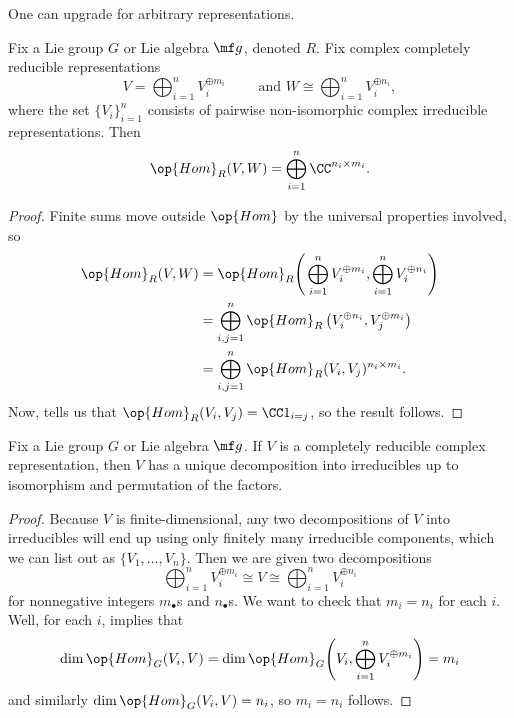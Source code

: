 \documentclass[../notes.tex]{subfiles}
\begin{document}
One can upgrade  for arbitrary representations.
\begin{corollary} \label{cor:compute-hom-by-irreps}
	Fix a Lie group $G$ or Lie algebra $\mf g$, denoted $R$. Fix complex completely reducible representations
	\[V=\bigoplus_{i=1}^nV_i^{\oplus m_i}\qquad\text{ and }W\cong\bigoplus_{i=1}^nV_i^{\oplus n_i},\]
	where the set $\{V_i\}_{i=1}^n$ consists of pairwise non-isomorphic complex irreducible representations. Then
	\[\op{Hom}_R(V,W)=\bigoplus_{i=1}^n\CC^{n_i\times m_i}.\]
\end{corollary}
\begin{proof}
	Finite sums move outside $\op{Hom}$ by the universal properties involved, so
	\begin{align*}
		\op{Hom}_R(V,W) &= \op{Hom}_R\Bigg(\bigoplus_{i=1}^nV_i^{\oplus m_i},\bigoplus_{i=1}^nV_i^{\oplus n_i}\Bigg) \\
		&= \bigoplus_{i,j=1}^n\op{Hom}_R\left(V_i^{\oplus n_i},V_j^{\oplus m_i}\right) \\
		&= \bigoplus_{i,j=1}^n\op{Hom}_R(V_i,V_j)^{n_i\times m_i}.
	\end{align*}
	Now,  tells us that $\op{Hom}_R(V_i,V_j)=\CC1_{i=j}$, so the result follows.
\end{proof}
\begin{corollary} \label{cor:unique-irrep-decomp}
	Fix a Lie group $G$ or Lie algebra $\mf g$. If $V$ is a completely reducible complex representation, then $V$ has a unique decomposition into irreducibles up to isomorphism and permutation of the factors.
\end{corollary}
\begin{proof}
	Because $V$ is finite-dimensional, any two decompositions of $V$ into irreducibles will end up using only finitely many irreducible components, which we can list out as $\{V_1,\ldots,V_n\}$. Then we are given two decompositions
	\[\bigoplus_{i=1}^nV_i^{\oplus m_i}\cong V\cong\bigoplus_{i=1}^nV_i^{\oplus n_i}\]
	for nonnegative integers $m_\bullet$s and $n_\bullet$s. We want to check that $m_i=n_i$ for each $i$. Well, for each $i$,  implies that
	\[\dim\op{Hom}_G(V_i,V)=\dim\op{Hom}_G\Bigg(V_i,\bigoplus_{i=1}^nV_i^{\oplus m_i}\Bigg)=m_i\]
	and similarly $\dim\op{Hom}_G(V_i,V)=n_i$, so $m_i=n_i$ follows.
\end{proof}
\end{document}

